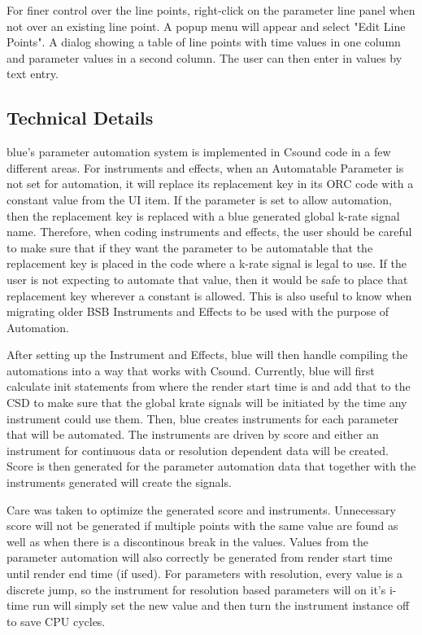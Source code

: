 For finer control over the line points, right-click on the parameter
line panel when not over an existing line point. A popup menu will
appear and select "Edit Line Points". A dialog showing a table of line
points with time values in one column and parameter values in a second
column. The user can then enter in values by text entry.

\subsection{Technical Details}

blue's parameter automation system is implemented in Csound code in a
few different areas. For instruments and effects, when an Automatable
Parameter is not set for automation, it will replace its replacement key
in its ORC code with a constant value from the UI item. If the parameter
is set to allow automation, then the replacement key is replaced with a
blue generated global k-rate signal name. Therefore, when coding
instruments and effects, the user should be careful to make sure that if
they want the parameter to be automatable that the replacement key is
placed in the code where a k-rate signal is legal to use. If the user is
not expecting to automate that value, then it would be safe to place
that replacement key wherever a constant is allowed. This is also useful
to know when migrating older BSB Instruments and Effects to be used with
the purpose of Automation.

After setting up the Instrument and Effects, blue will then handle
compiling the automations into a way that works with Csound. Currently,
blue will first calculate init statements from where the render start
time is and add that to the CSD to make sure that the global krate
signals will be initiated by the time any instrument could use them.
Then, blue creates instruments for each parameter that will be
automated. The instruments are driven by score and either an instrument
for continuous data or resolution dependent data will be created. Score
is then generated for the parameter automation data that together with
the instruments generated will create the signals.

Care was taken to optimize the generated score and instruments.
Unnecessary score will not be generated if multiple points with the same
value are found as well as when there is a discontinous break in the
values. Values from the parameter automation will also correctly be
generated from render start time until render end time (if used). For
parameters with resolution, every value is a discrete jump, so the
instrument for resolution based parameters will on it's i-time run will
simply set the new value and then turn the instrument instance off to
save CPU cycles.

